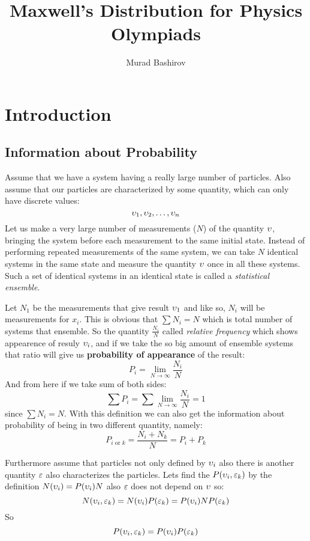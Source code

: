 \documentclass[a4paper, 12pt]{article}
\title{Maxwell's Distribution for Physics Olympiads}
\author{Murad Bashirov}
\date{}
\begin{document}
\begin{titlepage}
    \maketitle
    \tableofcontents
\end{titlepage}
\section{Introduction}
\subsection{Information about Probability}
Assume that we have a system having a really large number of particles.
Also assume that our particles are characterized by some quantity, which can only have discrete values:
$$\upsilon_1,\upsilon_2,\ldots,\upsilon_n$$
Let us make a very large number of measurements ($N$) of the quantity $\upsilon$, bringing the system before 
each measurement to the same initial state. Instead of performing repeated measurements of the
same system, we can take $N$ identical systems in the same state and measure the quantity 
$\upsilon$ once in all these systems. Such a set of identical systems in an identical state is called a 
\emph{statistical ensemble}.

Let $N_1$ be the measurements that give result $\upsilon_1$ and like so, $N_i$ will be measurements for $x_i$.
This is obvious that $\sum N_i = N$ which is total number of systems that ensemble. So the quantity $\frac{N_i}{N}$ called 
\emph{relative frequency} which shows appearence of resuly $\upsilon_i$, and if we take the so big amount of ensemble systems
that ratio will give us \textbf{probability of appearance} of the result: $$P_i=\lim_{N\to\infty}\frac{N_i}{N}$$
And from here if we take sum of both sides:$$\sum P_i =\sum \lim_{N\to\infty}\frac{N_i}{N}=1$$
since $\sum N_i =N$. With this definition we can also get the information about probability of being in two different quantity, namely:
$$P_{i\text{ or }k}=\frac{N_i+N_k}{N}=P_i+P_k$$

Furthermore assume that particles not only defined by $\upsilon_i$ also there is another quantity $\varepsilon$ also characterizes the particles.
Lets find  the $P(\upsilon_i,\varepsilon_k )$ by the definition $N(\upsilon_i)=P(\upsilon_i)N$ also $\varepsilon$ does not depend on $\upsilon$ so:
$$N(\upsilon_i,\varepsilon_k)=N(\upsilon_i)P(\varepsilon_k)=P(\upsilon_i)NP(\varepsilon_k)$$
So \begin{equation} \label{eq:multiply}
    P(\upsilon_i,\varepsilon_k )=P(\upsilon_i)P(\varepsilon_k)
\end{equation}
\end{document}
